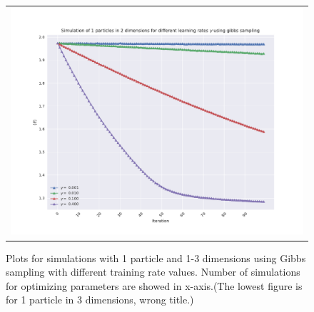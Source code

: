 \begin{figure}
\begin{tabular}{cc}
\multicolumn{2}{c}{\includegraphics[width=0.5\paperwidth]{figures/gibbs_1p_3d_N4.pdf} }
\end{tabular}
\caption{Plots for simulations with 1 particle and 1-3 dimensions using Gibbs sampling with different training rate values. Number of simulations for optimizing parameters are showed in x-axis.(The lowest figure is for 1 particle in 3 dimensions, wrong title.)}
\label{fig:1f_1}
\end{figure}

